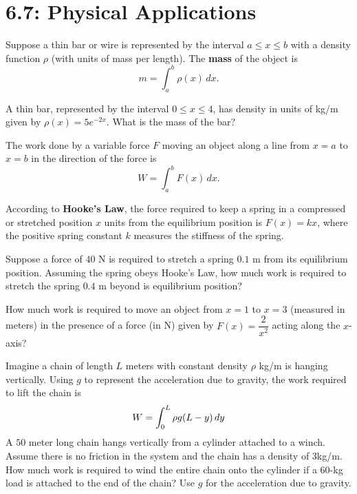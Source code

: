 \documentclass[../mathNotesPreamble]{subfiles}
\begin{document}
  \section{6.7: Physical Applications}

  \begin{defn*}
    Suppose a thin bar or wire is represented by the interval $a\leq x\leq b$ with a density function $\rho$ (with units of mass per length). The \textbf{mass} of the object is
      \[m=\int_a^b \rho(x)\,dx.\]
  \end{defn*}

  \begin{ex*}
    A thin bar, represented by the interval $0\leq x\leq 4$, has density in units of kg/m given by $\rho(x)=5e^{-2x}$. What is the mass of the bar?
  \end{ex*}
  \pagebreak

  \begin{defn*}[Work]
    The work done by a variable force $F$ moving an object along a line from $x=a$ to $x=b$ in the direction of the force is
      \[W=\int_a^b F(x)\,dx.\]
  \end{defn*}

  \begin{ex*}
    According to \textbf{Hooke's Law}, the force required to keep a spring in a compressed or stretched position $x$ units from the equilibrium position is $F(x)=kx$, where the positive spring constant $k$ measures the stiffness of the spring.
    \vspace*{\baselineskip}

    Suppose a force of $40$ N is required to stretch a spring $0.1$ m from its equilibrium position. Assuming the spring obeys Hooke's Law, how much work is required to stretch the spring $0.4$ m beyond is equilibrium position? 
  \end{ex*}

  \begin{ex*}
    How much work is required to move an object from $x=1$ to $x=3$ (measured in meters) in the presence of a force (in N) given by $F(x)=\dfrac{2}{x^2}$ acting along the $x$-axis?
  \end{ex*}
  \pagebreak

  \begin{ex*}
    Imagine a chain of length $L$ meters with constant density $\rho$ kg/m is hanging vertically. Using $g$ to represent the acceleration due to gravity, the work required to lift the chain is
      \[W=\int_0^L \rho g{\left(L-y\right)}\,dy\]
    A $50$ meter long chain hangs vertically from a cylinder attached to a winch. Assume there is no friction in the system and the chain has a density of $3$\nobreakspace kg/m. How much work is required to wind the entire chain onto the cylinder if a $60$-kg load is attached to the end of the chain? Use $g$ for the acceleration due to gravity.
  \end{ex*}
  \pagebreak
\end{document}
